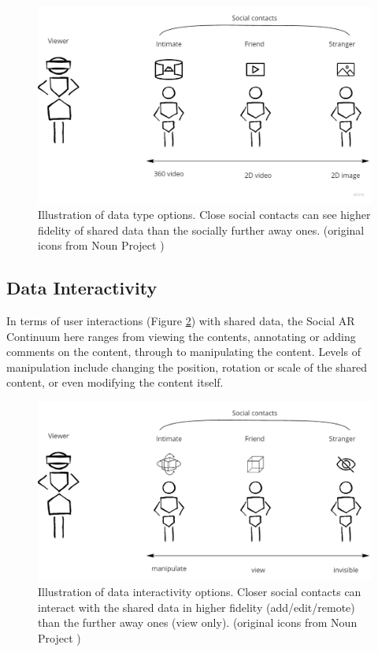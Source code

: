 \begin{figure}[ht]
    \centering
    \includegraphics[width=0.8\linewidth]{images/30-continuum/Continuum-Data-type.jpg}
    \caption{Illustration of data type options. Close social contacts can see higher fidelity of shared data than the socially further away ones. (original icons from Noun Project \cite{TheNounProjectInc.})}
    \label{fig:continuum:data-type}
\end{figure}

\subsection{Data Interactivity}

In terms of user interactions (Figure \ref{fig:continuum:data-interaction}) with shared data, the Social AR Continuum here ranges from viewing the contents, annotating or adding comments on the content, through to manipulating the content. Levels of manipulation include changing the position, rotation or scale of the shared content, or even modifying the content itself.

\begin{figure}[ht]
    \centering
    \includegraphics[width=0.8\linewidth]{images/30-continuum/Continuum-interaction.jpg}
    \caption{Illustration of data interactivity options. Closer social contacts can interact with the shared data in higher fidelity (add/edit/remote) than the further away ones (view only). (original icons from Noun Project \cite{TheNounProjectInc.})}
    \label{fig:continuum:data-interaction}
\end{figure}

